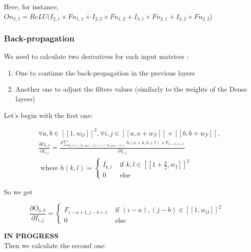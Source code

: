 \documentclass[11pt,a4paper]{report}
\begin{document}
Here, for instance, $On_{2,1} = ReLU(I_{2,1} \times Fn_{1,1} + I_{2,2} \times Fn_{1,2} + I_{3,1} \times Fn_{2,1} + I_{3,2} \times Fn_{2,2}$)


\subsubsection{Back-propagation}

We need to calculate two derivatives for each input matrices :

\begin{enumerate}
    \item One to continue the back-propagation in the previous layers
    \item Another one to adjust the filters values (similarly to the weights of the Dense layers)
\end{enumerate}

Let's begin with the first one: 

\begin{equation}
\begin{split}
    &\forall a,b \in [\![1,w_O]\!]^2, \forall i,j \in [\![a,a+w_F]\!] \times [\![b,b+w_F]\!],\\
    &\frac{\partial O_{a,b}}{\partial I_{i,j}} = \frac{\partial \sum\limits_{k,l \in [\![0,w_F-1]\!] \times [\![0,w_F-1]\!]} h(a+k,b+l)\times F_{k+1,l+1}}{\partial I_{i,j}} \\
    &\text{ where } h(k,l) = \begin{cases}
        I_{k,l} &\text{ if } k,l \in [\![1+\frac{p}{2},w_I]\!]^2\\
        0 &\text{ else}
    \end{cases}
\end{split}
\end{equation}

So we get

\begin{equation}
    \frac{\partial O_{a,b}}{\partial I_{i,j}} = \begin{cases}
        F_{i-a+1,j-b+1} &\text{ if } (i-a),(j-b) \in [\![1,w_O]\!]^2 \\
        0 &\text{ else}
    \end{cases}
\end{equation}

\textbf{IN PROGRESS}
\\

Then we calculate the second one:
\end{document}
